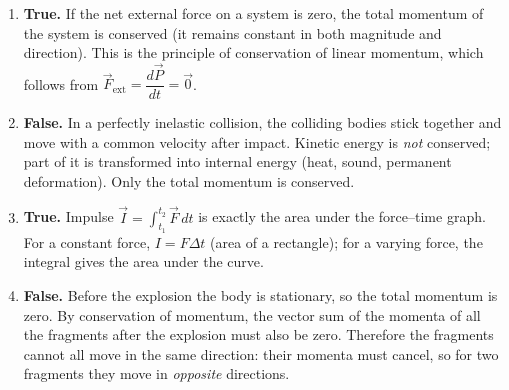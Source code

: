 \documentclass[11pt]{article}
\begin{document}
\begin{corrige}
\begin{enumerate}
\item \textbf{True.} If the net external force on a system is zero, the total momentum of the system is conserved (it remains constant in both magnitude and direction). This is the principle of conservation of linear momentum, which follows from $\vec{F}_{\mathrm{ext}} = \dfrac{d\vec{P}}{dt} = \vec{0}$.

\item \textbf{False.} In a perfectly inelastic collision, the colliding bodies stick together and move with a common velocity after impact. Kinetic energy is \emph{not} conserved; part of it is transformed into internal energy (heat, sound, permanent deformation). Only the total momentum is conserved.

\item \textbf{True.} Impulse $\vec{I} = \displaystyle\int_{t_1}^{t_2} \vec{F}\,dt$ is exactly the area under the force–time graph. For a constant force, $I = F\Delta t$ (area of a rectangle); for a varying force, the integral gives the area under the curve.

\item \textbf{False.} Before the explosion the body is stationary, so the total momentum is zero. By conservation of momentum, the vector sum of the momenta of all the fragments after the explosion must also be zero. Therefore the fragments cannot all move in the same direction: their momenta must cancel, so for two fragments they move in \emph{opposite} directions.
\end{enumerate}
\end{corrige}
\end{document}
